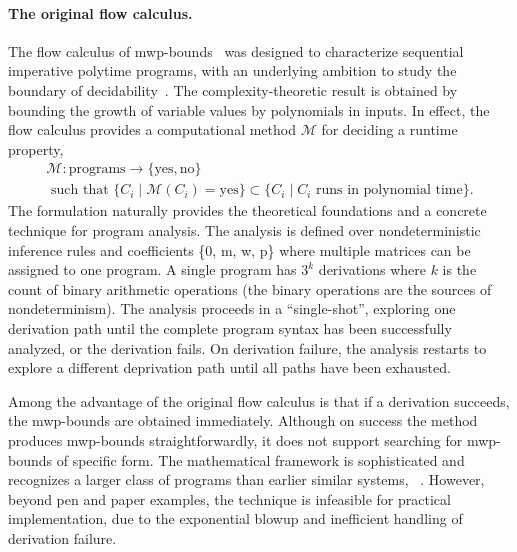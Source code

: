 \paragraph*{The original flow calculus.}
The flow calculus of mwp-bounds~\cite{jones2009} was designed to characterize sequential imperative polytime programs,
with an underlying ambition to study the boundary of decidability~\cite{kristiansen2017}.
The complexity-theoretic result is obtained by bounding the growth of variable values by polynomials in inputs.
In effect, the flow calculus provides a computational method \(\mathcal{M}\) for deciding a runtime property,
\begin{gather*}
\mathcal{M}: \text{programs} \rightarrow \{ \text{yes}, \text{no} \} \\
\text{ such that } \{C_i \mid \mathcal{M}(C_i) = \text{yes} \} \subset \{ C_i \mid C_i \text{ runs in polynomial time} \}.
\end{gather*}
The formulation naturally provides the theoretical foundations and a concrete technique for program analysis.
The analysis is defined over nondeterministic inference rules and coefficients \{0, m, w, p\} where multiple matrices can be assigned to one program.
A single program has \(3^k\) derivations where \(k\) is the count of binary arithmetic operations (the binary operations are the sources of nondeterminism).
The analysis proceeds in a \enquote{single-shot}, exploring one derivation path until the complete program syntax has been successfully analyzed, or the derivation fails.
On derivation failure, the analysis restarts to explore a different deprivation path until all paths have been exhausted.

Among the advantage of the original flow calculus
is that if a derivation succeeds, the mwp-bounds are obtained immediately.
Although on success the method produces mwp-bounds straightforwardly, it does not support searching for mwp-bounds of specific form.
The mathematical framework is sophisticated and recognizes a larger class of programs than earlier similar systems, \eg~\cite{niggl2006}.
However, beyond pen and paper examples, the technique is infeasible for practical implementation, due to the exponential blowup and inefficient handling of derivation failure.

